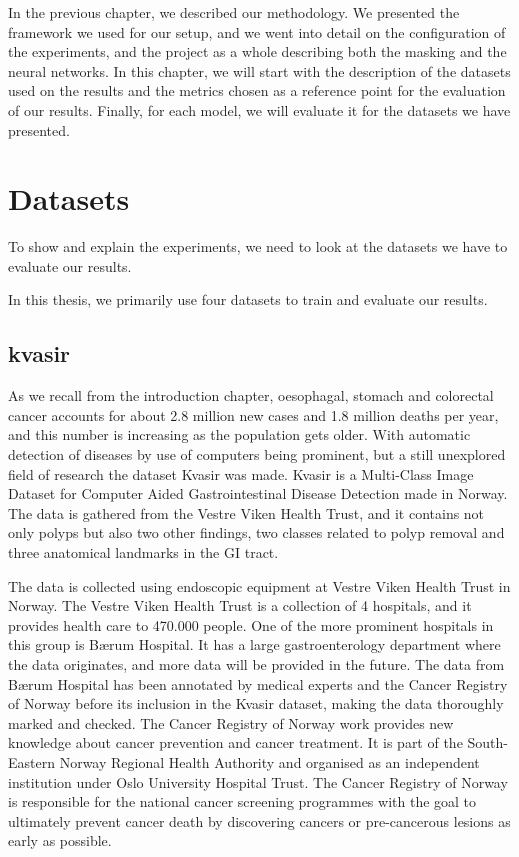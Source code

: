 In the previous chapter, we described our methodology. We presented the framework we used for our setup, and we went into detail on the configuration of the experiments, and the project as a whole describing both the masking and the neural networks. 
In this chapter, we will start with the description of the datasets used on the results and the metrics chosen as a reference point for the evaluation of our results. 
Finally, for each model, we will evaluate it for the datasets we have presented.

\section{Datasets}
To show and explain the experiments, we need to look at the datasets we have to evaluate our results. 

In this thesis, we primarily use four datasets to train and evaluate our results.



\subsection{kvasir}



As we recall from the introduction chapter, oesophagal, stomach and colorectal cancer accounts for about 2.8 million new cases and 1.8 million deaths per year, and this number is increasing as the population gets older.   With automatic detection of diseases by use of computers being prominent, but a still unexplored field of research the dataset Kvasir was made.
Kvasir is a Multi-Class Image Dataset for Computer Aided Gastrointestinal Disease Detection made in Norway. The data is gathered from the Vestre Viken Health Trust, and it contains not only polyps but also two other findings, two classes related to polyp removal and three anatomical landmarks in the GI tract.

The data is collected using endoscopic equipment at Vestre Viken Health Trust in Norway. The Vestre Viken Health Trust is a collection of 4 hospitals, and it provides health care to 470.000 people.
One of the more prominent hospitals in this group is Bærum Hospital. It has a large gastroenterology department where the data originates, and more data will be provided in the future. The data from Bærum Hospital has been annotated by medical experts and the Cancer Registry of Norway before its inclusion in the Kvasir dataset, making the data thoroughly marked and checked.
The Cancer Registry of Norway work provides new knowledge about cancer prevention and cancer treatment. It is part of the South-Eastern Norway Regional Health Authority and organised as an independent institution under Oslo University Hospital Trust. The Cancer Registry of Norway is responsible for the national cancer screening programmes with the goal to ultimately prevent cancer death by discovering cancers or pre-cancerous lesions as early as possible. 



